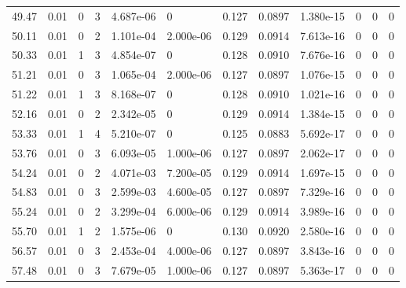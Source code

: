 \documentclass[preview]{standalone}
\begin{document}
{{{\begin{tabular}{L{1.2cm}C{1.2cm} C{0.3cm}C{0.5cm} C{1.4cm}C{1.4cm} C{1.4cm}C{1.4cm} C{1.6cm}C{1.6cm} C{1.6cm}C{1.6cm}}
  49.47  &  0.01  & 0     &  3 &  4.687e-06  & 0  &  0.127&   0.0897& 1.380e-15 & 0   &  0 & 0  \\ 
  50.11  &  0.01  & 0     &  2 &  1.101e-04  & 2.000e-06  &  0.129&   0.0914& 7.613e-16 & 0   &  0 & 0  \\ 
  50.33  &  0.01  & 1     &  3 &  4.854e-07  & 0  &  0.128&   0.0910& 7.676e-16 & 0   &  0 & 0  \\ 
  51.21  &  0.01  & 0     &  3 &  1.065e-04  & 2.000e-06  &  0.127&   0.0897& 1.076e-15 & 0   &  0 & 0  \\ 
  51.22  &  0.01  & 1     &  3 &  8.168e-07  & 0  &  0.128&   0.0910& 1.021e-16 & 0   &  0 & 0  \\ 
  52.16  &  0.01  & 0     &  2 &  2.342e-05  & 0  &  0.129&   0.0914& 1.384e-15 & 0   &  0 & 0  \\ 
  53.33  &  0.01  & 1     &  4 &  5.210e-07  & 0  &  0.125&   0.0883& 5.692e-17 & 0   &  0 & 0  \\ 
  53.76  &  0.01  & 0     &  3 &  6.093e-05  & 1.000e-06  &  0.127&   0.0897& 2.062e-17 & 0   &  0 & 0  \\ 
  54.24  &  0.01  & 0     &  2 &  4.071e-03  & 7.200e-05  &  0.129&   0.0914& 1.697e-15 & 0   &  0 & 0  \\ 
  54.83  &  0.01  & 0     &  3 &  2.599e-03  & 4.600e-05  &  0.127&   0.0897& 7.329e-16 & 0   &  0 & 0  \\ 
  55.24  &  0.01  & 0     &  2 &  3.299e-04  & 6.000e-06  &  0.129&   0.0914& 3.989e-16 & 0   &  0 & 0  \\ 
  55.70  &  0.01  & 1     &  2 &  1.575e-06  & 0  &  0.130&   0.0920& 2.580e-16 & 0   &  0 & 0  \\ 
  56.57  &  0.01  & 0     &  3 &  2.453e-04  & 4.000e-06  &  0.127&   0.0897& 3.843e-16 & 0   &  0 & 0  \\ 
  57.48  &  0.01  & 0     &  3 &  7.679e-05  & 1.000e-06  &  0.127&   0.0897& 5.363e-17 & 0   &  0 & 0  \\ 
\hline 
\end{tabular} 

}}}
\end{document}
